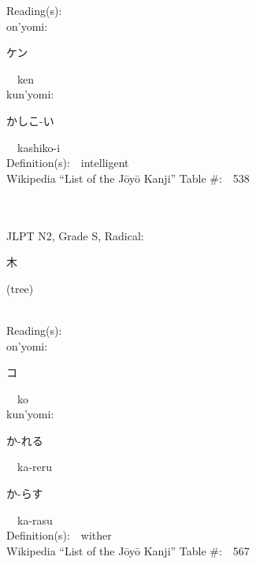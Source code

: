 \begin{multicols}{2}
Reading(s):\ \ \\
{\hspace*{1em}}on'yomi:\ \ \\
{\hspace*{2em}}{\begin{CJK}{UTF8}{min} ケン \end{CJK}}\ \ ken\ \ \\
{\hspace*{1em}}kun'yomi:\ \ \\
{\hspace*{2em}}{\begin{CJK}{UTF8}{min} かしこ-い \end{CJK}}\ \ kashiko-i\ \ \\
Definition(s):\ \ intelligent \\
Wikipedia ``List of the J\=oy\=o Kanji'' Table \#:\ \ 538 \\
\ \ \\
{\fontsize{34pt}{40pt}  }\ \ \\  %
{JLPT N2, Grade S, Radical:\ \ {\begin{CJK}{UTF8}{min} 木 \end{CJK}} (tree) } \\
Reading(s):\ \ \\
{\hspace*{1em}}on'yomi:\ \ \\
{\hspace*{2em}}{\begin{CJK}{UTF8}{min} コ \end{CJK}}\ \ ko\ \ \\
{\hspace*{1em}}kun'yomi:\ \ \\
{\hspace*{2em}}{\begin{CJK}{UTF8}{min} か-れる \end{CJK}}\ \ ka-reru\ \ \\
{\hspace*{2em}}{\begin{CJK}{UTF8}{min} か-らす \end{CJK}}\ \ ka-rasu\ \ \\
Definition(s):\ \ wither \\
Wikipedia ``List of the J\=oy\=o Kanji'' Table \#:\ \ 567 \\
\ \ \\

\end{multicols}

